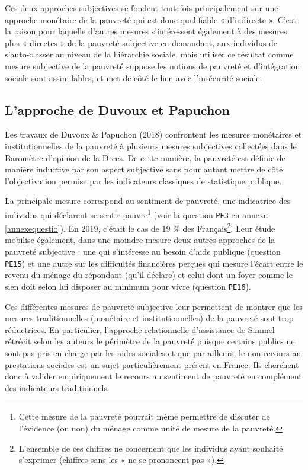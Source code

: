 \documentclass[12pt,a4paper]{reedthesis}
\begin{document}
Ces deux approches subjectives se fondent toutefois principalement sur une approche monétaire de la pauvreté qui est donc qualifiable « d'indirecte ». C'est la raison pour laquelle d'autres mesures s'intéressent également à des mesures plus « directes » de la pauvreté subjective en demandant, aux individus de s'auto-classer au niveau de la hiérarchie sociale, mais utiliser ce résultat comme mesure subjective de la pauvreté suppose les notions de pauvreté et d'intégration sociale sont assimilables, et met de côté le lien avec l'insécurité sociale.

\hypertarget{sec:approcheduvoux}{%
\subsection{L'approche de Duvoux et Papuchon}\label{sec:approcheduvoux}}

Les travaux de Duvoux \& Papuchon (2018) confrontent les mesures monétaires et institutionnelles de la pauvreté à plusieurs mesures subjectives collectées dans le Baromètre d'opinion de la Drees. De cette manière, la pauvreté est définie de manière inductive par son aspect subjective sans pour autant mettre de côté l'objectivation permise par les indicateurs classiques de statistique publique.

La principale mesure correspond au sentiment de pauvreté, une indicatrice des individus qui déclarent se sentir pauvre\footnote{ Cette mesure de la pauvreté pourrait même permettre de discuter de l'évidence (ou non) du ménage comme unité de mesure de la pauvreté.} (voir la question \texttt{PE3} en annexe \ref{annexequestio}). En 2019, c'était le cas de 19 \% des Français\footnote{ L'ensemble de ces chiffres ne concernent que les individus ayant souhaité s'exprimer (chiffres sans les « ne se prononcent pas »).}. Leur étude mobilise également, dans une moindre mesure deux autres approches de la pauvreté subjective : une qui s'intéresse au besoin d'aide publique (question \texttt{PE15}) et une autre sur les difficultés financières perçues qui mesure l'écart entre le revenu du ménage du répondant (qu'il déclare) et celui dont un foyer comme le sien doit selon lui disposer au minimum pour vivre (question \texttt{PE16}).

Ces différentes mesures de pauvreté subjective leur permettent de montrer que les mesures traditionnelles (monétaire et institutionnelles) de la pauvreté sont trop réductrices. En particulier, l'approche relationnelle d'assistance de Simmel rétrécit selon les auteurs le périmètre de la pauvreté puisque certains publics ne sont pas pris en charge par les aides sociales et que par ailleurs, le non-recours au prestations sociales est un sujet particulièrement présent en France. Ils cherchent donc à valider empiriquement le recours au sentiment de pauvreté en complément des indicateurs traditionnels.
\end{document}
